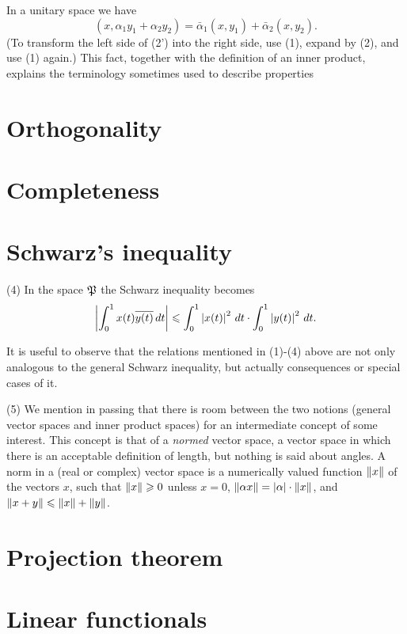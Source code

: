In a unitary space we have
\begin{equation*}
    (x, \alpha_1 y_1 + \alpha_2 y_2) = \bar{\alpha}_1(x, y_1) + \bar{\alpha}_2(x, y_2).
\end{equation*}
(To transform the left side of (2') into the right side, use (1), expand by (2), and use (1) again.) This fact, together with the definition of an inner
product, explains the terminology sometimes used to describe properties

\section{Orthogonality}

\section{Completeness}

\section{Schwarz's inequality}

(4) In the space \(\frak{P}\) the Schwarz inequality becomes
\begin{equation*}
    \left\lvert\int_{0}^{1} x(t)\overline{y(t)}\, dt\right\rvert \leqslant \int_0^1 \left\lvert x(t)\right\rvert^2\, dt\cdot\int_0^1 \left\lvert y(t)\right\rvert^2\, dt.
\end{equation*}

It is useful to observe that the relations mentioned in (1)-(4) above are not
only analogous to the general Schwarz inequality, but actually consequences or
special cases of it.

(5) We mention in passing that there is room between the two notions (general
vector spaces and inner product spaces) for an intermediate concept of some
interest. This concept is that of a \emph{normed} vector space, a vector space
in which there is an acceptable definition of length, but nothing is said about
angles. A norm in a (real or complex) vector space is a numerically valued
function \(\left\lVert x\right\rVert\) of the vectors \(x\), such that \(\left\lVert x\right\rVert \geqslant 0\) unless
\(x = 0\), \(\left\lVert\alpha x\right\rVert = \left\lvert\alpha\right\rvert\cdot\left\lVert x\right\rVert\), and \(\left\lVert x + y\right\rVert
\leqslant \left\lVert x\right\rVert + \left\lVert y\right\rVert\).

\section{Projection theorem}

\section{Linear functionals}


